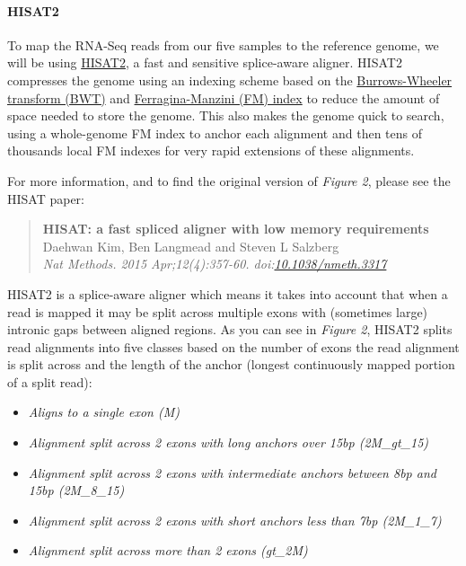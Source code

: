 \documentclass[11pt]{article}
\providecommand{\tightlist}{%
      \setlength{\itemsep}{0pt}\setlength{\parskip}{0pt}}
\begin{document}
\hypertarget{hisat2}{%
\paragraph{HISAT2}\label{hisat2}}

To map the RNA-Seq reads from our five samples to the reference genome,
we will be using
\href{https://ccb.jhu.edu/software/hisat2/index.shtml}{HISAT2}, a fast
and sensitive splice-aware aligner. HISAT2 compresses the genome using
an indexing scheme based on the
\href{https://en.wikipedia.org/wiki/Burrows\%E2\%80\%93Wheeler_transform}{Burrows-Wheeler
transform (BWT)} and
\href{https://en.wikipedia.org/wiki/FM-index}{Ferragina-Manzini (FM)
index} to reduce the amount of space needed to store the genome. This
also makes the genome quick to search, using a whole-genome FM index to
anchor each alignment and then tens of thousands local FM indexes for
very rapid extensions of these alignments.

For more information, and to find the original version of \textit{Figure
2}, please see the HISAT paper:

\begin{quote}
\textbf{HISAT: a fast spliced aligner with low memory requirements}\\
Daehwan Kim, Ben Langmead and Steven L Salzberg\\
\textit{Nat Methods. 2015 Apr;12(4):357-60.
doi:\href{https://www.nature.com/articles/nmeth.3317}{10.1038/nmeth.3317}}
\end{quote}

HISAT2 is a splice-aware aligner which means it takes into account that
when a read is mapped it may be split across multiple exons with
(sometimes large) intronic gaps between aligned regions. As you can see
in \textit{Figure 2}, HISAT2 splits read alignments into five classes
based on the number of exons the read alignment is split across and the
length of the anchor (longest continuously mapped portion of a split
read):

\begin{itemize}
\tightlist
\item
  \textit{Aligns to a single exon (M)}
\item
  \textit{Alignment split across 2 exons with long anchors over 15bp
  (2M\_gt\_15)}
\item
  \textit{Alignment split across 2 exons with intermediate anchors between
  8bp and 15bp (2M\_8\_15)}
\item
  \textit{Alignment split across 2 exons with short anchors less than 7bp
  (2M\_1\_7)}
\item
  \textit{Alignment split across more than 2 exons (gt\_2M)}
\end{itemize}
\end{document}
